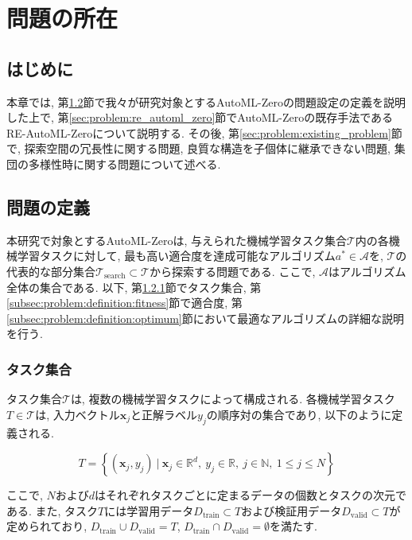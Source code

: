 \documentclass[11pt,oneside,openany,report]{jsbook}
\begin{document}
\chapter{問題の所在}\label{chap:problem}

\section{はじめに} \label{sec:problem:introduction}
本章では, 第\ref{sec:problem:definition}節で我々が研究対象とするAutoML-Zeroの問題設定の定義を説明した上で, 第\ref{sec:problem:re_automl_zero}節でAutoML-Zeroの既存手法であるRE-AutoML-Zeroについて説明する. その後, 第\ref{sec:problem:existing_problem}節で, 探索空間の冗長性に関する問題, 良質な構造を子個体に継承できない問題, 集団の多様性時に関する問題について述べる.

\section{問題の定義} \label{sec:problem:definition}

本研究で対象とするAutoML-Zeroは, 与えられた機械学習タスク集合$\mathcal{T}$内の各機械学習タスクに対して, 最も高い適合度を達成可能なアルゴリズム$a^\ast \in \mathcal{A}$を, $\mathcal{T}$の代表的な部分集合$\mathcal{T}_\mathrm{search} \subset \mathcal{T}$から探索する問題である. ここで, $\mathcal{A}$はアルゴリズム全体の集合である. 以下, 第\ref{subsec:problem:definition:tasksets}節でタスク集合, 第\ref{subsec:problem:definition:fitness}節で適合度, 第\ref{subsec:problem:definition:optimum}節において最適なアルゴリズムの詳細な説明を行う.

\subsection{タスク集合}\label{subsec:problem:definition:tasksets}

タスク集合$\mathcal{T}$は, 複数の機械学習タスクによって構成される. 各機械学習タスク$T \in \mathcal{T}$は, 入力ベクトル$\bm{x}_j$と正解ラベル$y_j$の順序対の集合であり, 以下のように定義される.

$$
  T = \left\{\left(\bm{x}_j, y_j \right) \ |\ \bm{x}_j \in \mathbb{R}^{d},\ y_j \in \mathbb{R},\ j \in \mathbb{N},\ 1 \le j \le N \right\}
$$

\noindent
ここで, $N$および$d$はそれぞれタスクごとに定まるデータの個数とタスクの次元である. また, タスク$T$には学習用データ$D_\mathrm{train} \subset T$および検証用データ$D_\mathrm{valid} \subset T$が定められており, $D_\mathrm{train} \cup D_\mathrm{valid} = T $, $D_\mathrm{train} \cap D_\mathrm{valid} = \emptyset$を満たす.
\end{document}
